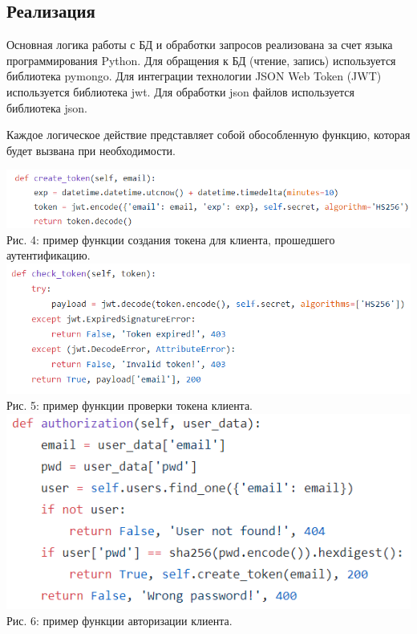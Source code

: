\documentclass[14pt,a4paper,openbib]{extarticle}
\numberwithin{equation}{section}
\begin{document}
\newpage
\subsection{Реализация}
Основная логика работы с БД и обработки запросов реализована за счет языка программирования Python. Для обращения к БД (чтение, запись) используется библиотека pymongo. Для интеграции технологии JSON Web Token (JWT) используется библиотека jwt. Для обработки json файлов используется библиотека json.

Каждое логическое действие представляет собой обособленную функцию, которая будет вызвана при необходимости.
\begin{center}
\includegraphics[width=\textwidth]{img/create_token.png}\\
Рис. 4: пример функции создания токена для клиента, прошедшего аутентификацию.\\[\baselineskip]
\includegraphics[scale=0.6]{img/check_token.png}\\
Рис. 5: пример функции проверки токена клиента.\\[\baselineskip]
\includegraphics[scale=0.6]{img/authorization.png}\\
Рис. 6: пример функции авторизации клиента.\\[\baselineskip]
\end{center}
\end{document}
